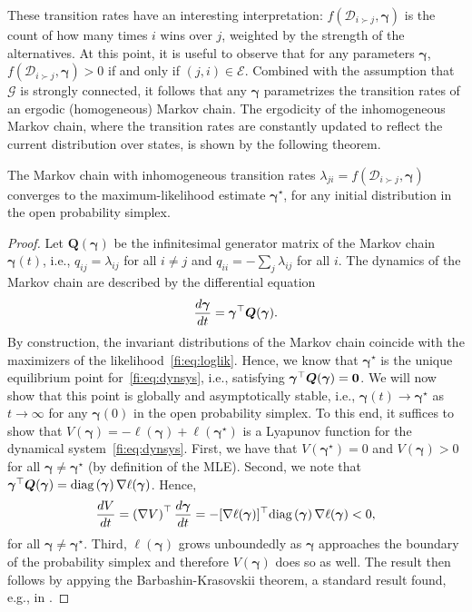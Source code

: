 These transition rates have an interesting interpretation: $f(\mathcal{D}_{i \succ j}, \bm{\gamma})$ is the count of how many times $i$ wins over $j$, weighted by the strength of the alternatives.
At this point, it is useful to observe that for any parameters $\bm{\gamma}$, $f(\mathcal{D}_{i \succ j}, \bm{\gamma}) > 0$ if and only if $(j,i) \in \mathcal{E}$.
Combined with the assumption that $\mathcal{G}$ is strongly connected, it follows that any $\bm{\gamma}$ parametrizes the transition rates of an ergodic (homogeneous) Markov chain.
The ergodicity of the inhomogeneous Markov chain, where the transition rates are constantly updated to reflect the current distribution over states, is shown by the following theorem.
\begin{theorem}
\label{fi:thm:convergence}
The Markov chain with inhomogeneous transition rates $\lambda_{ji} = f(\mathcal{D}_{i \succ j}, \bm{\gamma})$ converges to the maximum-likelihood estimate $\bm{\gamma}^\star$, for any initial distribution in the open probability simplex.
\end{theorem}

\begin{proof}[Proof]
Let $\bm{Q}(\bm{\gamma})$ be the infinitesimal generator matrix of the Markov chain $\bm{\gamma}(t)$, i.e., $q_{ij} = \lambda_{ij}$ for all $i \ne j$ and  $q_{ii} = - \sum_{j} \lambda_{ij}$ for all $i$.
The dynamics of the Markov chain are described by the differential equation
\begin{align}
\label{fi:eq:dynsys}
\frac{d \bm{\gamma}}{dt} = \bm{\gamma}^\top \bm{Q}(\bm{\gamma}).
\end{align}
By construction, the invariant distributions of the Markov chain coincide with the maximizers of the likelihood~\eqref{fi:eq:loglik}.
Hence, we know that $\bm{\gamma}^\star$ is the unique equilibrium point for~\eqref{fi:eq:dynsys}, i.e., satisfying $\bm{\gamma}^\top \bm{Q}(\bm{\gamma}) = \bm{0}$.
We will now show that this point is globally and asymptotically stable, i.e., $\bm{\gamma}(t) \to \bm{\gamma}^\star$ as $t \to \infty$ for any $\bm{\gamma}(0)$ in the open probability simplex.
To this end, it suffices to show that $V(\bm{\gamma}) = - \ell(\bm{\gamma}) + \ell(\bm{\gamma}^\star)$ is a Lyapunov function for the dynamical system~\eqref{fi:eq:dynsys}.
First, we have that $V(\bm{\gamma}^\star) = 0$ and $V(\bm{\gamma}) > 0$ for all $\bm{\gamma} \ne \bm{\gamma}^\star$ (by definition of the MLE).
Second, we note that $\bm{\gamma}^\top \bm{Q}(\bm{\gamma}) = \text{diag} \left( \bm{\gamma} \right)  \nabla \ell(\bm{\gamma})$.
Hence,
\begin{align*}
\frac{dV}{dt}
    = \left( \nabla V \right)^\top \frac{d \bm{\gamma}}{dt}
    = - [\nabla \ell(\bm{\gamma})]^\top \text{diag} \left( \bm{\gamma} \right)  \nabla \ell(\bm{\gamma})
    < 0,
\end{align*}
for all $\bm{\gamma} \ne \bm{\gamma}^\star$.
Third, $\ell(\bm{\gamma})$ grows unboundedly as $\bm{\gamma}$ approaches the boundary of the probability simplex \citep[Lemma~1]{hunter2004mm} and therefore $V(\bm{\gamma})$ does so as well.
The result then follows by appying the Barbashin-Krasovskii theorem, a standard result found, e.g., in \citet[Chapter~3]{khalil1996nonlinear}.
\end{proof}



